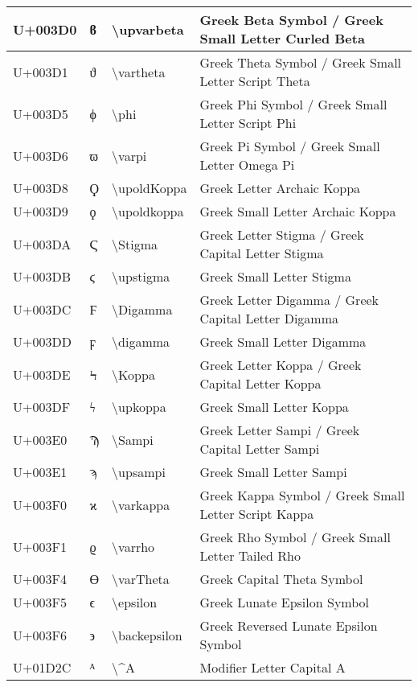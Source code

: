 \begin{table}[h]
\begin{tabulary}{\linewidth}{|L|L|L|L|}
\hline
U+003D0 & ϐ & {\textbackslash}upvarbeta & Greek Beta Symbol / Greek Small Letter Curled Beta \\
\hline
U+003D1 & ϑ & {\textbackslash}vartheta & Greek Theta Symbol / Greek Small Letter Script Theta \\
\hline
U+003D5 & ϕ & {\textbackslash}phi & Greek Phi Symbol / Greek Small Letter Script Phi \\
\hline
U+003D6 & ϖ & {\textbackslash}varpi & Greek Pi Symbol / Greek Small Letter Omega Pi \\
\hline
U+003D8 & Ϙ & {\textbackslash}upoldKoppa & Greek Letter Archaic Koppa \\
\hline
U+003D9 & ϙ & {\textbackslash}upoldkoppa & Greek Small Letter Archaic Koppa \\
\hline
U+003DA & Ϛ & {\textbackslash}Stigma & Greek Letter Stigma / Greek Capital Letter Stigma \\
\hline
U+003DB & ϛ & {\textbackslash}upstigma & Greek Small Letter Stigma \\
\hline
U+003DC & Ϝ & {\textbackslash}Digamma & Greek Letter Digamma / Greek Capital Letter Digamma \\
\hline
U+003DD & ϝ & {\textbackslash}digamma & Greek Small Letter Digamma \\
\hline
U+003DE & Ϟ & {\textbackslash}Koppa & Greek Letter Koppa / Greek Capital Letter Koppa \\
\hline
U+003DF & ϟ & {\textbackslash}upkoppa & Greek Small Letter Koppa \\
\hline
U+003E0 & Ϡ & {\textbackslash}Sampi & Greek Letter Sampi / Greek Capital Letter Sampi \\
\hline
U+003E1 & ϡ & {\textbackslash}upsampi & Greek Small Letter Sampi \\
\hline
U+003F0 & ϰ & {\textbackslash}varkappa & Greek Kappa Symbol / Greek Small Letter Script Kappa \\
\hline
U+003F1 & ϱ & {\textbackslash}varrho & Greek Rho Symbol / Greek Small Letter Tailed Rho \\
\hline
U+003F4 & ϴ & {\textbackslash}varTheta & Greek Capital Theta Symbol \\
\hline
U+003F5 & ϵ & {\textbackslash}epsilon & Greek Lunate Epsilon Symbol \\
\hline
U+003F6 & ϶ & {\textbackslash}backepsilon & Greek Reversed Lunate Epsilon Symbol \\
\hline
U+01D2C & ᴬ & {\textbackslash}{\textasciicircum}A & Modifier Letter Capital A \\
\hline

\end{tabulary}
\end{table}
